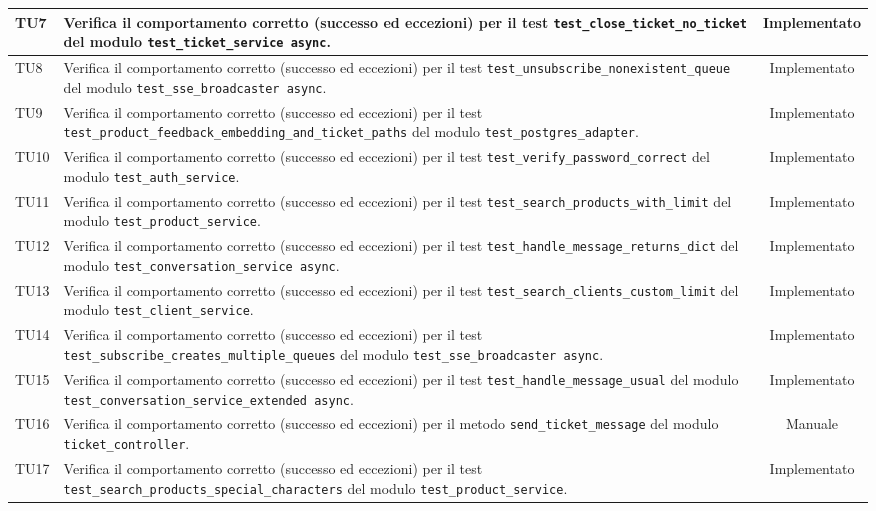 \documentclass[a4paper,11pt,oneside]{scrartcl}
\begin{document}
\begin{longtable}{|p{1.9cm}|p{11.6cm}|c|}
    TU7 & Verifica il comportamento corretto (successo ed eccezioni) per il test \texttt{test\_close\_ticket\_no\_ticket} del modulo \texttt{test\_ticket\_service     async}. & Implementato \\ \hline
    TU8 & Verifica il comportamento corretto (successo ed eccezioni) per il test \texttt{test\_unsubscribe\_nonexistent\_queue} del modulo \texttt{test\_sse\_broadcaster     async}. & Implementato \\ \hline
    TU9 & Verifica il comportamento corretto (successo ed eccezioni) per il test \texttt{test\_product\_feedback\_embedding\_and\_ticket\_paths} del modulo \texttt{test\_postgres\_adapter}. & Implementato \\ \hline
    TU10 & Verifica il comportamento corretto (successo ed eccezioni) per il test \texttt{test\_verify\_password\_correct} del modulo \texttt{test\_auth\_service}. & Implementato \\ \hline
    TU11 & Verifica il comportamento corretto (successo ed eccezioni) per il test \texttt{test\_search\_products\_with\_limit} del modulo \texttt{test\_product\_service}. & Implementato \\ \hline
    TU12 & Verifica il comportamento corretto (successo ed eccezioni) per il test \texttt{test\_handle\_message\_returns\_dict} del modulo \texttt{test\_conversation\_service     async}. & Implementato \\ \hline
    TU13 & Verifica il comportamento corretto (successo ed eccezioni) per il test \texttt{test\_search\_clients\_custom\_limit} del modulo \texttt{test\_client\_service}. & Implementato \\ \hline
    TU14 & Verifica il comportamento corretto (successo ed eccezioni) per il test \texttt{test\_subscribe\_creates\_multiple\_queues} del modulo \texttt{test\_sse\_broadcaster     async}. & Implementato \\ \hline
    TU15 & Verifica il comportamento corretto (successo ed eccezioni) per il test \texttt{test\_handle\_message\_usual} del modulo \texttt{test\_conversation\_service\_extended async}. & Implementato \\ \hline
    TU16 & Verifica il comportamento corretto (successo ed eccezioni) per il metodo \texttt{send\_ticket\_message} del modulo \texttt{ticket\_controller}. & Manuale \\ \hline
    TU17 & Verifica il comportamento corretto (successo ed eccezioni) per il test \texttt{test\_search\_products\_special\_characters} del modulo \texttt{test\_product\_service}. & Implementato \\ \hline

\end{longtable}
\end{document}
